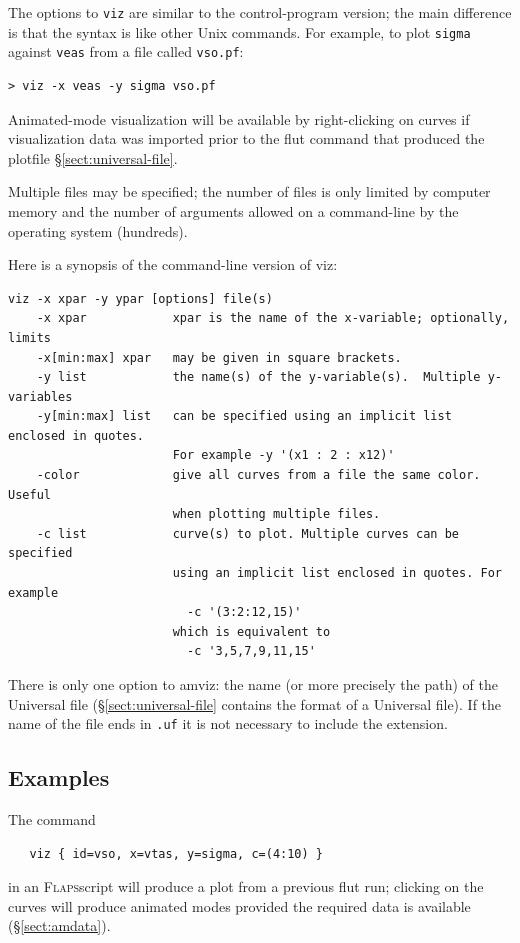 \documentclass[11pt,openany,twoside]{book}
\numberwithin{equation}{section}		%
\newcommand{\Cmd}[1]{{\sf #1}}
\newcommand{\Code}[1]{{\small\tt #1}}
\newcommand{\Flaps}{\textsc{Flaps\:}}
\newcommand{\Spec}[1]{{\small\ttfamily #1}}
\newcommand{\Sectref}[1]{\S\ref{#1}}
\begin{document}
The options to \Code{viz} are similar to the control-program
version; the main difference is that the syntax is like
other Unix commands. For example, to plot \Code{sigma} against \Code{veas}
from a file called \Code{vso.pf}:
\begin{lstlisting}
> viz -x veas -y sigma vso.pf
\end{lstlisting}
Animated-mode visualization will be available by right-clicking on
curves if visualization data was imported prior to the \Cmd{flut} command
that produced the plotfile \Sectref{sect:universal-file}.
\par
Multiple files may be specified; the number of files is only limited by
computer memory and the number of arguments allowed on a command-line by
the operating system (hundreds).
\par
Here is a synopsis of the command-line version of \Cmd{viz}:
\begin{lstlisting}
viz -x xpar -y ypar [options] file(s)
    -x xpar            xpar is the name of the x-variable; optionally, limits
    -x[min:max] xpar   may be given in square brackets.
    -y list            the name(s) of the y-variable(s).  Multiple y-variables
    -y[min:max] list   can be specified using an implicit list enclosed in quotes.
                       For example -y '(x1 : 2 : x12)'
    -color             give all curves from a file the same color. Useful
                       when plotting multiple files.
    -c list            curve(s) to plot. Multiple curves can be specified
                       using an implicit list enclosed in quotes. For example
                         -c '(3:2:12,15)'
                       which is equivalent to
                         -c '3,5,7,9,11,15'
\end{lstlisting}
There is only one option to \Cmd{amviz}: the name (or more precisely the path)
of the Universal file (\Sectref{sect:universal-file} contains the format of
a Universal file).
If the name of the file ends in \Code{.uf} it is not
necessary to include the extension.

\subsection{Examples}
The command
\begin{lstlisting}
   viz { id=vso, x=vtas, y=sigma, c=(4:10) }
\end{lstlisting}
in an \Flaps script will produce a plot from a previous
\Cmd{flut} run; clicking on the curves will produce
animated modes provided the required data is available (\Sectref{sect:amdata}).
\par
\end{document}
